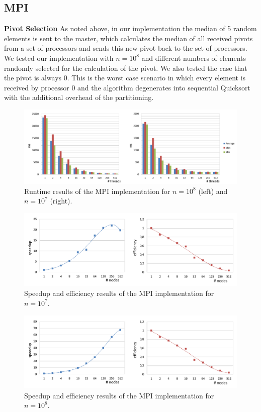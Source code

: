 \documentclass[11pt,a4paper]{article}
\begin{document}
\subsection{MPI}
\textbf{Pivot Selection}\newline
As noted above, in our implementation the median of 5 random elements is sent to the master, which calculates the median of all received pivots from a set of processors and sends this new pivot back to the set of processors. We tested our implementation with $n=10^{8}$ and different numbers of elements randomly selected for the calculation of the pivot. We also tested the case that the pivot is always 0. This is the worst case scenario in which every element is received by processor 0 and the algorithm degenerates into sequential Quicksort with the additional overhead of the partitioning.
\begin{figure}[h]
	\includegraphics[width=\textwidth]{img/mpi_results.pdf}
	\caption{Runtime results of the MPI implementation for $n=10^{8}$ (left) and $n=10^{7}$ (right).}
\end{figure}
\begin{figure}[h]
	\includegraphics[width=\textwidth]{img/mpi_results_sp_eff10.pdf}
	\caption{Speedup and efficiency results of the MPI implementation for $n=10^{7}$.}
\end{figure}
\begin{figure}[h]
	\includegraphics[width=\textwidth]{img/mpi_results_sp_eff100.pdf}
	\caption{Speedup and efficiency results of the MPI implementation for $n=10^{8}$.}
\end{figure}
\end{document}
